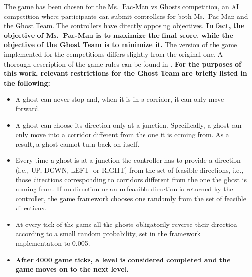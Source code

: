 \documentclass[journal]{IEEEtran}
\begin{document}
The game has been chosen for the Ms.\  Pac-Man vs Ghosts competition, an AI competition where participants can submit controllers for both Ms.\  Pac-Man and the Ghost Team. The controllers have directly opposing objectives. \textbf{In fact, the objective of Ms.\  Pac-Man is to maximize the final score, while the objective of the Ghost Team is to minimize it.} The version of the game implemented for the competitions differs slightly from the original one. A thorough description of the game rules can be found in \cite{MsPacManVSGhost2011}. \textbf{For the purposes of this work, relevant restrictions for the Ghost Team are briefly listed in the following:}
\begin{itemize}
  \item A ghost can never stop and, when it is in a corridor, it can only move forward.
  \item A ghost can choose its direction only at a junction. Specifically, a ghost can only move into a corridor different from the one it is coming from. As a result, a ghost cannot turn back on itself.
  \item Every time a ghost is at a junction the controller has to provide a direction (i.e., UP, DOWN, LEFT, or RIGHT) from the set of feasible directions, i.e., those directions corresponding to corridors different from the one the ghost is coming from. If no direction or an unfeasible direction is returned by the controller, the game framework chooses one randomly from the set of feasible directions.
  \item At every tick of the game all the ghosts obligatorily reverse their direction according to a small random probability, set in the framework implementation to 0.005.
  \item \textbf{After 4000 game ticks, a level is considered completed and the game moves on to the next level.}
\end{itemize}
\end{document}
